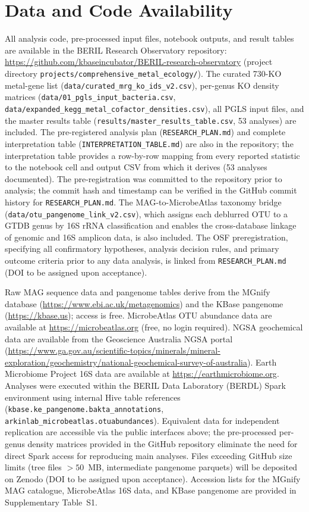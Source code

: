 \documentclass[times]{zHenriquesLab-StyleBioRxiv}
\begin{document}


\section*{Data and Code Availability}

All analysis code, pre-processed input files, notebook outputs, and result
tables are available in the BERIL Research Observatory repository:
\url{https://github.com/kbaseincubator/BERIL-research-observatory}
(project directory \texttt{projects/comprehensive\_metal\_ecology/}).
The curated 730-KO metal-gene list (\texttt{data/curated\_mrg\_ko\_ids\_v2.csv}),
per-genus KO density matrices (\texttt{data/01\_pgls\_input\_bacteria.csv},
\texttt{data/expanded\_kegg\_metal\_cofactor\_densities.csv}), all PGLS input
files, and the master results table (\texttt{results/master\_results\_table.csv},
53 analyses) are included. The pre-registered analysis plan
(\texttt{RESEARCH\_PLAN.md}) and complete interpretation table
(\texttt{INTERPRETATION\_TABLE.md}) are also in the repository; the
interpretation table provides a row-by-row mapping from every reported
statistic to the notebook cell and output CSV from which it derives (53
analyses documented). The pre-registration was committed to the repository
prior to analysis; the commit hash and timestamp can be verified in the
GitHub commit history for \texttt{RESEARCH\_PLAN.md}. The
MAG-to-MicrobeAtlas taxonomy bridge (\texttt{data/otu\_pangenome\_link\_v2.csv}),
which assigns each deblurred OTU to a GTDB genus by 16S rRNA classification and
enables the cross-database linkage of genomic and 16S amplicon data, is also
included. The OSF preregistration, specifying all confirmatory hypotheses,
analysis decision rules, and primary outcome criteria prior to any data analysis,
is linked from \texttt{RESEARCH\_PLAN.md} (DOI to be assigned upon acceptance).

Raw MAG sequence data and pangenome tables derive from the MGnify database
(\url{https://www.ebi.ac.uk/metagenomics}) and the KBase pangenome
(\url{https://kbase.us}); access is free. MicrobeAtlas OTU abundance data
are available at \url{https://microbeatlas.org} (free, no login required). NGSA
geochemical data are available from the Geoscience Australia NGSA portal
(\url{https://www.ga.gov.au/scientific-topics/minerals/mineral-exploration/geochemistry/national-geochemical-survey-of-australia}).
Earth Microbiome Project 16S data are available at \url{https://earthmicrobiome.org}.
Analyses were executed within the BERIL Data Laboratory (BERDL) Spark environment
using internal Hive table references (\texttt{kbase.ke\_pangenome.bakta\_annotations},
\texttt{arkinlab\_microbeatlas.otuabundances}). Equivalent data for independent
replication are accessible via the public interfaces above; the pre-processed
per-genus density matrices provided in the GitHub repository eliminate the need
for direct Spark access for reproducing main analyses. Files exceeding GitHub size
limits (tree files $> 50$~MB, intermediate pangenome parquets) will be deposited
on Zenodo (DOI to be assigned upon acceptance). Accession lists for the
MGnify MAG catalogue, MicrobeAtlas 16S data, and KBase pangenome are provided
in Supplementary Table~S1.
\end{document}
